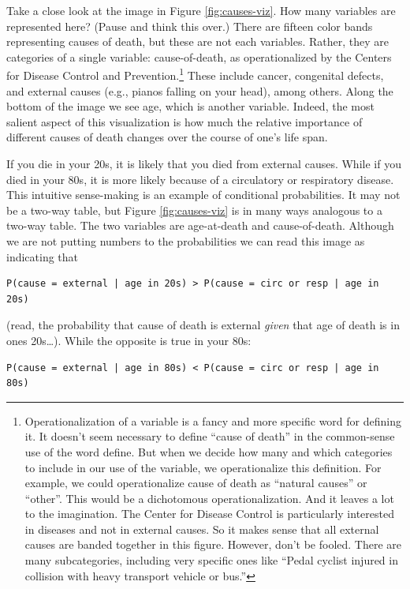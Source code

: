 \documentclass[openany]{book}
\begin{document}
Take a close look at the image in Figure \ref{fig:causes-viz}. How many variables are represented here? (Pause and think this over.) There are fifteen color bands representing causes of death, but these are not each variables. Rather, they are categories of a single variable: cause-of-death, as operationalized by the Centers for Disease Control and Prevention.\footnote{Operationalization of a variable is a fancy and more specific word for defining it. It doesn't seem necessary to define ``cause of death'' in the common-sense use of the word define. But when we decide how many and which categories to include in our use of the variable, we operationalize this definition. For example, we could operationalize cause of death as ``natural causes'' or ``other''. This would be a dichotomous operationalization. And it leaves a lot to the imagination. The Center for Disease Control is particularly interested in diseases and not in external causes. So it makes sense that all external causes are banded together in this figure. However, don't be fooled. There are many subcategories, including very specific ones like ``Pedal cyclist injured in collision with heavy transport vehicle or bus.''} These include cancer, congenital defects, and external causes (e.g., pianos falling on your head), among others. Along the bottom of the image we see age, which is another variable. Indeed, the most salient aspect of this visualization is how much the relative importance of different causes of death changes over the course of one's life span.

If you die in your 20s, it is likely that you died from external causes. While if you died in your 80s, it is more likely because of a circulatory or respiratory disease. This intuitive sense-making is an example of conditional probabilities. It may not be a two-way table, but Figure \ref{fig:causes-viz} is in many ways analogous to a two-way table. The two variables are age-at-death and cause-of-death. Although we are not putting numbers to the probabilities we can read this image as indicating that

\begin{verbatim}
P(cause = external | age in 20s) > P(cause = circ or resp | age in 20s)
\end{verbatim}

(read, the probability that cause of death is external \emph{given} that age of death is in ones 20s\ldots{}).
While the opposite is true in your 80s:

\begin{verbatim}
P(cause = external | age in 80s) < P(cause = circ or resp | age in 80s)
\end{verbatim}
\end{document}
